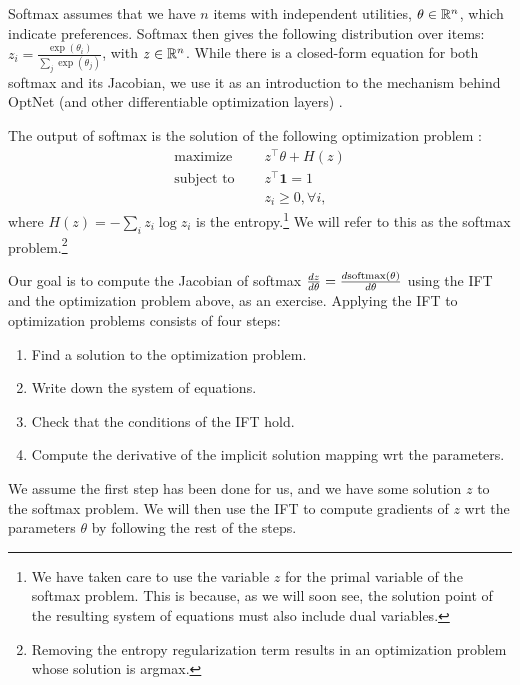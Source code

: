 \documentclass[11pt]{article}
\begin{document}
Softmax assumes that we have $n$ items with independent utilities, $\theta \in \mathbb{R}^n$,
which indicate preferences.
Softmax then gives the following distribution over items:
$z_i = \frac{\exp(\theta_i)}{\sum_j \exp(\theta_j)}$, with $z\in\mathbb{R}^n$.
While there is a closed-form equation
for both softmax and its Jacobian,
we use it as an introduction to the mechanism
behind OptNet (and other differentiable optimization layers)
\citep{optnet,agrawal2019diffcvx}.

The output of softmax is the solution of the following optimization problem \citep{gao2018properties}:
\begin{equation}
\label{eqn:softmax-opt}
\begin{aligned}
\textrm{maximize } \quad & z^\top\theta + H(z)\\
\textrm{subject to } \quad & z^\top \mathbf{1} = 1\\
& z_i \geq 0, \forall i,
\end{aligned}
\end{equation}
where $H(z) = -\sum_i z_i \log z_i$ is the entropy.\footnote{
We have taken care to use the variable $z$
for the primal variable of the softmax problem.
This is because, as we will soon see, the solution point of the resulting system
of equations must also include dual variables.
}
We will refer to this as the softmax problem.\footnote{
Removing the entropy regularization term results in an optimization problem
whose solution is argmax.
}

Our goal is to compute the Jacobian of softmax
$\frac{dz}{d\theta} = \frac{d\mathrm{softmax}(\theta)}{d\theta}$
using the IFT and the optimization problem above, as an exercise.
Applying the IFT to optimization problems consists of four steps:
\begin{enumerate}
\item Find a solution to the optimization problem.
\item Write down the system of equations.
\item Check that the conditions of the IFT hold.
\item Compute the derivative of the implicit solution mapping wrt the parameters.
\end{enumerate}

We assume the first step has been done for us,
and we have some solution $z$ to the softmax problem.
We will then use the IFT to compute gradients of $z$ wrt the parameters $\theta$
by following the rest of the steps.
\end{document}
